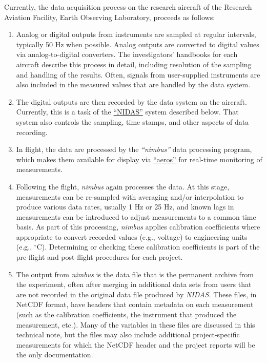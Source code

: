 \documentclass[
  english,
]{book}
\providecommand{\tightlist}{%
  \setlength{\itemsep}{0pt}\setlength{\parskip}{0pt}}
\begin{document}
Currently, the data acquisition process on the research aircraft of the Research Aviation Facility, Earth Observing Laboratory, proceeds as follows:

\begin{enumerate}
\def\labelenumi{\arabic{enumi}.}
\tightlist
\item
  Analog or digital outputs from instruments are sampled at regular intervals, typically 50 Hz when possible. Analog outputs are converted to digital values via analog-to-digital converters. The investigators' handbooks for each aircraft describe this process in detail, including resolution of the sampling and handling of the results. Often, signals from user-supplied instruments are also included in the measured values that are handled by the data system.\\
\item
  The digital outputs are then recorded by the data system on the aircraft. Currently, this is a task of the \href{http://www.eol.ucar.edu/data/software/nidas}{``NIDAS''} system described below. That system also controls the sampling, time stamps, and other aspects of data recording.\\
\item
  In flight, the data are processed by the \emph{``nimbus''} data processing program, which makes them available for display via \href{http://www.eol.ucar.edu/raf/Software/aeros_dnld.html}{``aeros''} for real-time monitoring of measurements.\\
\item
  Following the flight, \emph{nimbus} again processes the data. At this stage, measurements can be re-sampled with averaging and/or interpolation to produce various data rates, usually 1 Hz or 25 Hz, and known lags in measurements can be introduced to adjust measurements to a common time basis. As part of this processing, \emph{nimbus} applies calibration coefficients where appropriate to convert recorded values (e.g., voltage) to engineering units (e.g., \(^\circ\)C). Determining or checking these calibration coefficients is part of the pre-flight and post-flight procedures for each project.\\
\item
  The output from \emph{nimbus} is the data file that is the permanent archive from the experiment, often after merging in additional data sets from users that are not recorded in the original data file produced by \emph{NIDAS.} These files, in NetCDF format, have headers that contain metadata on each measurement (such as the calibration coefficients, the instrument that produced the measurement, etc.). Many of the variables in these files are discussed in this technical note, but the files may also include additional project-specific measurements for which the NetCDF header and the project reports will be the only documentation.
\end{enumerate}
\end{document}
